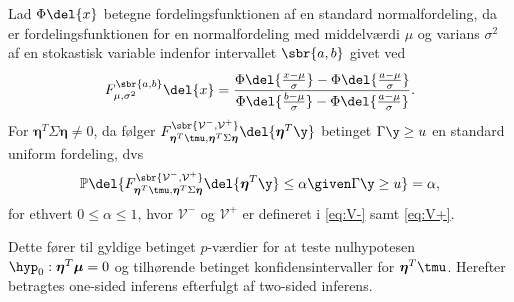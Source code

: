\begin{lem}  \label{lem:lem2}
Lad \(\Phi \del{x}\) betegne fordelingsfunktionen af en standard normalfordeling, da er fordelingsfunktionen for en normalfordeling med middelværdi \(\mu\) og varians \(\sigma^2\) af en stokastisk variable indenfor intervallet \(\sbr{a,b}\) givet ved
\begin{align*}
F_{\mu, \sigma^2}^{\sbr{a,b}} \del{x} = \frac{\Phi\del{\frac{x-\mu}{\sigma}} - \Phi\del{\frac{a-\mu}{\sigma}}}{\Phi\del{\frac{b-\mu}{\sigma}} - \Phi\del{\frac{a-\mu}{\sigma}}}.
\end{align*}
For \(\boldsymbol{\eta}^T \Sigma \boldsymbol{\eta} \neq 0\), da følger  \(F_{\boldsymbol{\eta}^T \tmu, \boldsymbol{\eta}^T \Sigma \boldsymbol{\eta}}^{\sbr{\mathcal{V}^-,\mathcal{V}^+}} \del{\boldsymbol{\eta}^T \y} \) betinget \(\Gamma \y \geq u\) en standard uniform fordeling, dvs
\begin{align*}
\mathbb{P} \del{F_{\boldsymbol{\eta}^T \tmu, \boldsymbol{\eta}^T \Sigma \boldsymbol{\eta}}^{\sbr{\mathcal{V}^-,\mathcal{V}^+}} \del{\boldsymbol{\eta}^T \y} \leq \alpha \given \Gamma \y \geq u} = \alpha, 
\end{align*}
for ethvert \(0 \leq \alpha \leq 1\), hvor \(\mathcal{V}^-\) og \(\mathcal{V}^+\) er defineret i \eqref{eq:V-} samt \eqref{eq:V+}. 
\end{lem}
%
Dette fører til gyldige betinget \(p\)-værdier for at teste nulhypotesen \(\hyp_0: \boldsymbol{\eta}^T \boldsymbol{\mu}=0\) og tilhørende betinget konfidensintervaller for \(\boldsymbol{\eta}^T \tmu\).
Herefter betragtes one-sided inferens efterfulgt af two-sided inferens.
%
